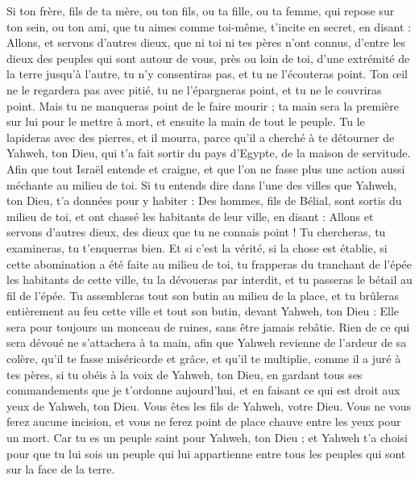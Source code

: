 \begin{multicols}{2}
Si ton frère, fils de ta mère, ou ton fils, ou ta fille, ou ta femme, qui repose sur ton sein, ou ton ami, que tu aimes comme toi-même, t'incite en secret, en disant : Allons, et servons d'autres dieux, que ni toi ni tes pères n'ont connus,
d'entre les dieux des peuples qui sont autour de vous, près ou loin de toi, d'une extrémité de la terre jusqu'à l'autre,
tu n'y consentiras pas, et tu ne l'écouteras point. Ton œil ne le regardera pas avec pitié, tu ne l'épargneras point, et tu ne le couvriras point.
Mais tu ne manqueras point de le faire mourir ; ta main sera la première sur lui pour le mettre à mort, et ensuite la main de tout le peuple.
Tu le lapideras avec des pierres, et il mourra, parce qu'il a cherché à te détourner de Yahweh, ton Dieu, qui t'a fait sortir du pays d'Egypte, de la maison de servitude.
Afin que tout Israël entende et craigne, et que l'on ne fasse plus une action aussi méchante au milieu de toi.
Si tu entends dire dans l'une des villes que Yahweh, ton Dieu, t'a données pour y habiter :
Des hommes, fils de Bélial, sont sortis du milieu de toi, et ont chassé les habitants de leur ville, en disant : Allons et servons d'autres dieux, des dieux que tu ne connais point !
Tu chercheras, tu examineras, tu t'enquerras bien. Et si c'est la vérité, si la chose est établie, si cette abomination a été faite au milieu de toi,
tu frapperas du tranchant de l'épée les habitants de cette ville, tu la dévoueras par interdit, et tu passeras le bétail au fil de l'épée.
Tu assembleras tout son butin au milieu de la place, et tu brûleras entièrement au feu cette ville et tout son butin, devant Yahweh, ton Dieu : Elle sera pour toujours un monceau de ruines, sans être jamais rebâtie.
Rien de ce qui sera dévoué ne s'attachera à ta main, afin que Yahweh revienne de l'ardeur de sa colère, qu'il te fasse miséricorde et grâce, et qu'il te multiplie, comme il a juré à tes pères,
si tu obéis à la voix de Yahweh, ton Dieu, en gardant tous ses commandements que je t'ordonne aujourd'hui, et en faisant ce qui est droit aux yeux de Yahweh, ton Dieu.
\VerseOne{}Vous êtes les fils de Yahweh, votre Dieu. Vous ne vous ferez aucune incision, et vous ne ferez point de place chauve entre les yeux pour un mort.
Car tu es un peuple saint pour Yahweh, ton Dieu ; et Yahweh t'a choisi pour que tu lui sois un peuple qui lui appartienne entre tous les peuples qui sont sur la face de la terre.

\end{multicols}
